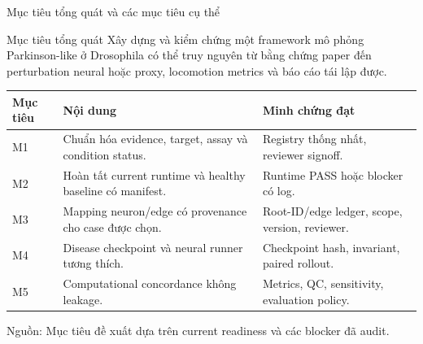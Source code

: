 \documentclass[10pt,aspectratio=169]{beamer}
\newcommand{\source}[1]{\par\vfill{\fontsize{6.0}{7}\selectfont\color{gray}Nguồn: #1\par}}
\begin{document}
\begin{frame}{Mục tiêu tổng quát và các mục tiêu cụ thể}
\begin{block}{Mục tiêu tổng quát}
Xây dựng và kiểm chứng một framework mô phỏng Parkinson-like ở Drosophila có thể truy nguyên từ bằng chứng paper đến perturbation neural hoặc proxy, locomotion metrics và báo cáo tái lập được.
\end{block}
\renewcommand{\arraystretch}{1.05}\scriptsize
\begin{tabular}{@{}L{1.5cm}L{8.3cm}L{4.0cm}@{}}
\toprule
\textbf{Mục tiêu} & \textbf{Nội dung} & \textbf{Minh chứng đạt}\\\midrule
M1 & Chuẩn hóa evidence, target, assay và condition status. & Registry thống nhất, reviewer signoff.\\
M2 & Hoàn tất current runtime và healthy baseline có manifest. & Runtime PASS hoặc blocker có log.\\
M3 & Mapping neuron/edge có provenance cho case được chọn. & Root-ID/edge ledger, scope, version, reviewer.\\
M4 & Disease checkpoint và neural runner tương thích. & Checkpoint hash, invariant, paired rollout.\\
M5 & Computational concordance không leakage. & Metrics, QC, sensitivity, evaluation policy.\\\bottomrule
\end{tabular}
\source{Mục tiêu đề xuất dựa trên current readiness và các blocker đã audit.}
\end{frame}
\end{document}
